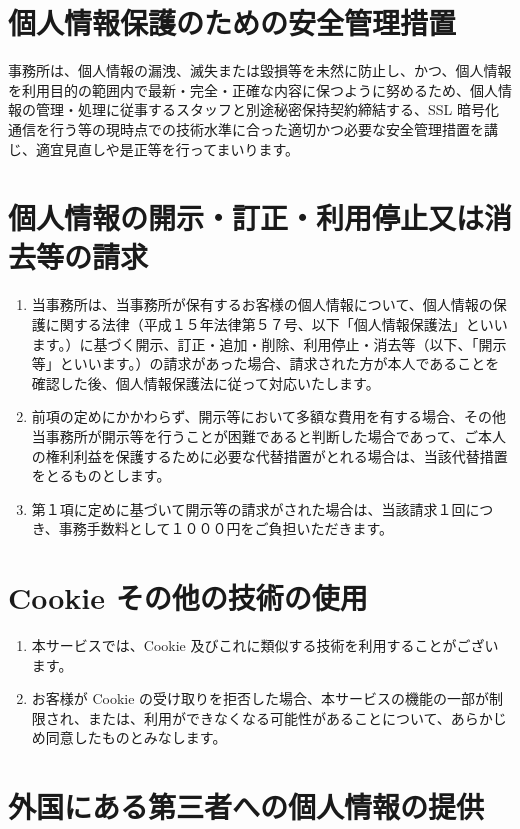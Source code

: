 \documentclass[a4j,titlepage]{ltjsarticle}
\begin{document}
\section{個人情報保護のための安全管理措置}
事務所は、個人情報の漏洩、滅失または毀損等を未然に防止し、かつ、個人情報を利用目的の範囲内で最新・完全・正確な内容に保つように努めるため、個人情報の管理・処理に従事するスタッフと別途秘密保持契約締結する、SSL 暗号化通信を行う等の現時点での技術水準に合った適切かつ必要な安全管理措置を講じ、適宜見直しや是正等を行ってまいります。

\section{個人情報の開示・訂正・利用停止又は消去等の請求}
\begin{enumerate}
	\item 当事務所は、当事務所が保有するお客様の個⼈情報について、個人情報の保護に関する法律（平成１５年法律第５７号、以下「個人情報保護法」といいます。）に基づく開⽰、訂正・追加・削除、利⽤停⽌・消去等（以下、「開示等」といいます。）の請求があった場合、請求された⽅が本⼈であることを確認した後、個⼈情報保護法に従って対応いたします。
	\item 前項の定めにかかわらず、開示等において多額な費用を有する場合、その他当事務所が開示等を行うことが困難であると判断した場合であって、ご本人の権利利益を保護するために必要な代替措置がとれる場合は、当該代替措置をとるものとします。
	\item 第１項に定めに基づいて開示等の請求がされた場合は、当該請求１回につき、事務手数料として１０００円をご負担いただきます。
\end{enumerate}

\section{Cookie その他の技術の使用}
\begin{enumerate}
	\item 本サービスでは、Cookie 及びこれに類似する技術を利用することがございます。
	\item お客様が Cookie の受け取りを拒否した場合、本サービスの機能の一部が制限され、または、利用ができなくなる可能性があることについて、あらかじめ同意したものとみなします。
\end{enumerate}


\section{外国にある第三者への個人情報の提供}
\end{document}
